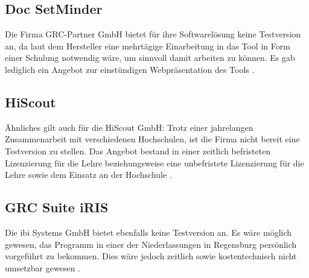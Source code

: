 \subsection{Doc SetMinder}
Die Firma GRC-Partner GmbH bietet für ihre Softwarelösung keine Testversion an, da laut dem Hersteller eine mehrtägige Einarbeitung in das Tool in Form einer Schulung notwendig wäre, um sinnvoll damit arbeiten zu können. Es gab lediglich ein Angebot zur einstündigen Webpräsentation des Tools \cite{docsetminder}. 

\subsection{HiScout}
Ähnliches gilt auch für die HiScout GmbH: Trotz einer jahrelangen Zusammenarbeit mit verschiedenen Hochschulen, ist die Firma nicht bereit eine Testversion zu stellen. Das Angebot bestand in einer zeitlich befristeten Lizenzierung für die Lehre beziehungsweise eine unbefristete Lizenzierung für die Lehre sowie dem Einsatz an der Hochschule \cite{hiscout}.

\subsection{GRC Suite iRIS}
Die ibi Systems GmbH bietet ebenfalls keine Testversion an. Es wäre möglich gewesen, das Programm in einer der Niederlassungen in Regensburg persönlich vorgeführt zu bekommen. Dies wäre jedoch zeitlich sowie kostentechnisch nicht umsetzbar gewesen \cite{grcsuite}.

